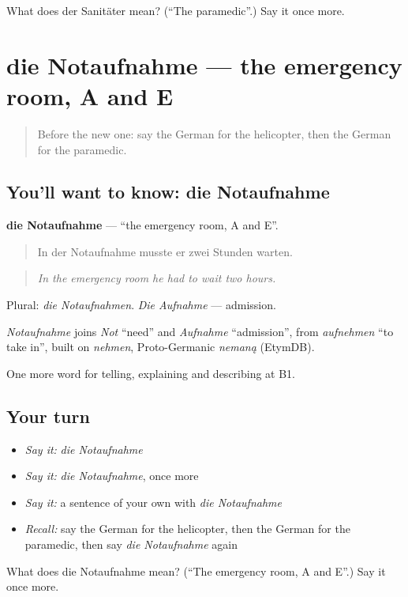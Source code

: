 \begin{tcolorbox}[breakable,colback=teal!4,colframe=teal!35!black,title={Before you move on}]
What does der Sanitäter mean? (\textquotedblleft{}The paramedic\textquotedblright{}.) Say it once more.
\end{tcolorbox}
\section[die Notaufnahme]{die Notaufnahme — the emergency room, A and E}

\label{lesson:GE-C291-notaufnahme}



\begin{quote}
Before the new one: say the German for the helicopter, then the German for the paramedic.
\end{quote}

\subsection*{You'll want to know: die Notaufnahme}
\textbf{die Notaufnahme} — \textquotedblleft{}the emergency room, A and E\textquotedblright{}.

\begin{quote}
In der Notaufnahme musste er zwei Stunden warten.
\end{quote}

\begin{quote}
\emph{In the emergency room he had to wait two hours.}
\end{quote}

Plural: \emph{die Notaufnahmen}. \emph{Die Aufnahme} — admission.

\begin{cousinweb}
\emph{Notaufnahme} joins \emph{Not} \textquotedblleft{}need\textquotedblright{} and \emph{Aufnahme} \textquotedblleft{}admission\textquotedblright{}, from \emph{aufnehmen} \textquotedblleft{}to take in\textquotedblright{}, built on \emph{nehmen}, Proto-Germanic \emph{nemaną} (EtymDB).
\end{cousinweb}

\begin{grammarlens}[title={What you've built}]
One more word for telling, explaining and describing at B1.
\end{grammarlens}

\subsection*{Your turn}
\begin{itemize}
\raggedright
  \item \emph{Say it:} \emph{die Notaufnahme}
  \item \emph{Say it:} \emph{die Notaufnahme}, once more
  \item \emph{Say it:} a sentence of your own with \emph{die Notaufnahme}
  \item \emph{Recall:} say the German for the helicopter, then the German for the paramedic, then say \emph{die Notaufnahme} again
\end{itemize}

\begin{tcolorbox}[breakable,colback=teal!4,colframe=teal!35!black,title={Before you move on}]
What does die Notaufnahme mean? (\textquotedblleft{}The emergency room, A and E\textquotedblright{}.) Say it once more.
\end{tcolorbox}
